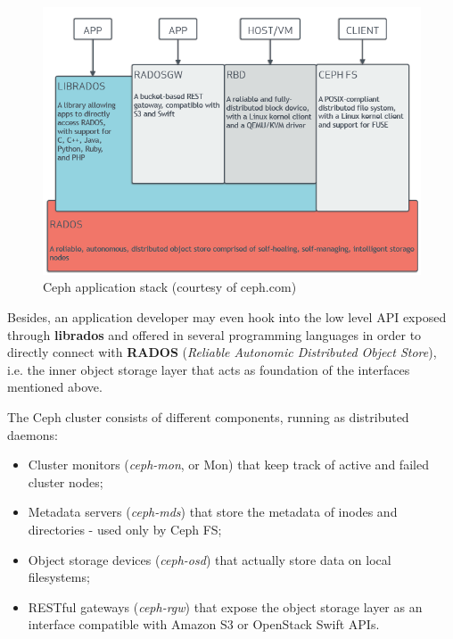 \documentclass{article}
\begin{document}
\begin{figure}[h]
    \centering
	\includegraphics[scale=0.35]{figs/ceph-stack.png}
	\caption{Ceph application stack (courtesy of ceph.com)}
	\label{fig:stack}
\end{figure}

Besides, an application developer may even hook into the low level API exposed through \textbf{librados} 
and offered in several programming languages in order to directly connect with \textbf{RADOS} 
(\textit{Reliable Autonomic Distributed Object Store}), i.e. the inner object storage layer
that acts as foundation of the interfaces mentioned above.

The Ceph cluster consists of different components, running as distributed daemons:
\begin{itemize}
	\item Cluster monitors (\textit{ceph-mon}, or Mon) that keep track of active and failed cluster nodes;
	\item Metadata servers (\textit{ceph-mds}) that store the metadata of inodes and directories - used only by Ceph FS;
    \item Object storage devices (\textit{ceph-osd}) that actually store data on local filesystems;
    \item RESTful gateways (\textit{ceph-rgw}) that expose the object storage layer as an interface 
    compatible with Amazon S3 or OpenStack Swift APIs.
\end{itemize}
\end{document}
